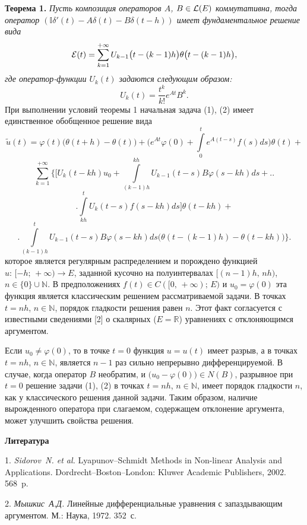 \textbf{Теорема 1.} {\it Пусть композиция операторов $A$, $B\in{\cal L}(E)$ коммутативна, тогда оператор $\left({\mathbb I}\delta'(t)-A\delta(t)-B\delta(t-h)\right)$ имеет фундаментальное решение вида
$$
{\cal E}(t)=\sum\limits_{k=1}^{+\infty}U_{k-1}\bigl(t-(k-1)h\bigr)\theta\bigl(t-(k-1)h\bigr),
$$
где оператор-функции $U_{k}(t)$ задаются следующим образом:
$$
U_{k}(t)=\frac{t^{k}}{k!}e^{At}B^{k}.
$$}
При выполнении условий теоремы 1 начальная задача (1), (2) имеет единственное обобщенное решение вида
$$
\tilde{u}(t)=\varphi(t)\bigl(\theta(t+h)-\theta(t)\bigr)+\bigl(e^{At}\varphi(0)+\int\limits_{0}^{t}e^{A(t-s)}f(s)ds\bigr)\theta(t)+
$$
$$
\sum\limits_{k=1}^{+\infty}\biggl\lbrace\biggl[ U_{k}(t-kh)u_{0}+\int\limits_{(k-1)h}^{kh}U_{k-1}(t-s)B\varphi(s-kh)ds+\biggr.\biggr.
$$
$$
\biggl.\int\limits_{kh}^{t}U_{k}(t-s)f(s-kh)ds\biggr]\theta(t-kh)+
$$
$$
\biggl.\int\limits_{(k-1)h}^{t}U_{k-1}(t-s)B\varphi(s-kh)ds\bigl(\theta(t-(k-1)h)-\theta(t-kh)\bigr)\biggr\rbrace.
$$
которое является регулярным распределением и порождено функцией $u:\,[-h;\,+\infty)\to E$, заданной кусочно на полуинтервалах $[(n-1)h,\,nh)$, $n\in\lbrace0\rbrace\cup{\mathbb N}$. В предположениях $f(t)\in C([0,\,+\infty);\,E)$ и $u_{0}=\varphi(0)$ эта функция является классическим решением рассматриваемой задачи. В точках $t=nh$, $n\in{\mathbb N}$, порядок гладкости решения равен $n$. Этот  факт согласуется с известными сведениями [2] о скалярных ($E={\mathbb R}$) уравнениях с отклоняющимся аргументом.

Если $u_{0}\neq\varphi(0)$, то в точке $t=0$ функция $u=u(t)$ имеет разрыв, а в точках $t=nh$, $n\in{\mathbb N}$, является $n-1$ раз сильно непрерывно дифференцируемой. В случае, когда оператор $B$ необратим, и $\bigl(u_{0}-\varphi(0)\bigr)\in N(B)$, разрывное при $t=0$ решение задачи (1), (2) в точках $t=nh$, $n\in{\mathbb N}$, имеет порядок гладкости $n$, как у классического решения данной задачи. Таким образом, наличие вырожденного оператора при слагаемом, содержащем отклонение аргумента, может улучшить свойства решения.

\smallskip \centerline{\bf Литература}\nopagebreak

1. {\it Sidorov~N. et al.} Lyapunov--Schmidt Methods in Non-linear Analysis and Applications. Dordrecht--Boston--London: Kluwer Academic Publishers, 2002. 568~p.

2. {\it Мышкис~А.Д.} Линейные дифференциальные уравнения с запаздывающим аргументом. М.: Наука, 1972. 352~с.

